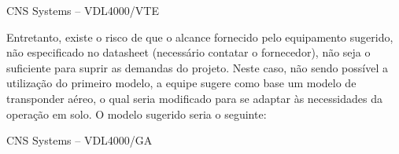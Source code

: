 CNS Systems – VDL4000/VTE \cite{transponderVDL4000}

Entretanto, existe o risco de que o alcance fornecido pelo equipamento sugerido, não especificado no datasheet (necessário contatar o fornecedor), não seja o suficiente para suprir as demandas do projeto. Neste caso, não sendo possível a utilização do primeiro modelo, a equipe sugere como base um modelo de transponder aéreo, o qual seria modificado para se adaptar às necessidades da operação em solo. O modelo sugerido seria o seguinte:

CNS Systems – VDL4000/GA \cite{transponderVDLGA}
